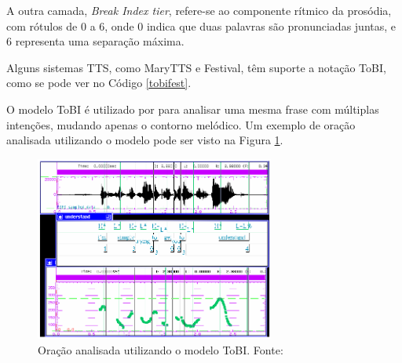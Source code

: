 A outra camada, \emph{Break Index tier}, refere-se ao componente rítmico da
prosódia, com rótulos de 0 a 6, onde 0 indica que duas palavras são
pronunciadas juntas, e 6 representa uma separação máxima.

Alguns sistemas TTS, como MaryTTS e Festival, têm suporte a notação ToBI, como se
pode ver no Código \ref{tobifest}.

O modelo ToBI é utilizado por  para analisar uma mesma
frase com múltiplas intenções, mudando apenas o contorno melódico. Um exemplo de
oração analisada utilizando o modelo pode ser visto na Figura \ref{fig:tobiana}.

\begin{figure}
  \centering
    \includegraphics[width=0.7\textwidth]{Imagens/tobi.png}
  \caption[Oração analisada utilizando o modelo ToBI]{Oração analisada utilizando o modelo ToBI. Fonte: \cite{tobiguide}}
  \label{fig:tobiana}
\end{figure}




